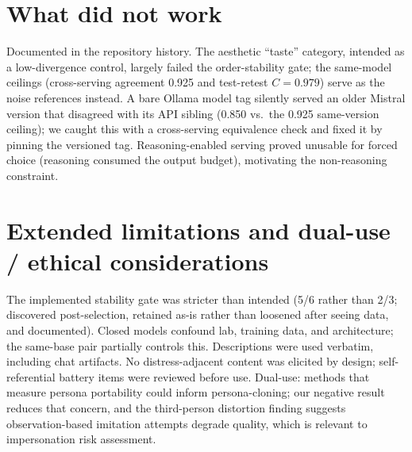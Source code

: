 \documentclass[11pt]{article}
\begin{document}
\section{What did not work}
Documented in the repository history. The aesthetic ``taste'' category,
intended as a low-divergence control, largely failed the order-stability gate;
the same-model ceilings (cross-serving agreement 0.925 and test-retest
$C=0.979$) serve as the noise references instead. A bare Ollama model tag
silently served an older Mistral version
that disagreed with its API sibling (0.850 vs.\ the 0.925 same-version
ceiling); we caught this with a cross-serving equivalence check and fixed it
by pinning the versioned tag. Reasoning-enabled serving proved unusable for
forced choice (reasoning consumed the output budget), motivating the
non-reasoning constraint.

\section{Extended limitations and dual-use / ethical considerations}
The implemented stability gate was stricter than intended (5/6 rather than
2/3; discovered post-selection, retained as-is rather than loosened after
seeing data, and documented). Closed models confound lab, training data, and
architecture; the same-base pair partially controls this. Descriptions were
used verbatim, including chat artifacts. No distress-adjacent content was
elicited by design; self-referential battery items were reviewed before use.
Dual-use: methods that measure persona portability could inform
persona-cloning; our negative result reduces that concern, and the
third-person distortion finding suggests observation-based imitation attempts
degrade quality, which is relevant to impersonation risk assessment.
\end{document}
